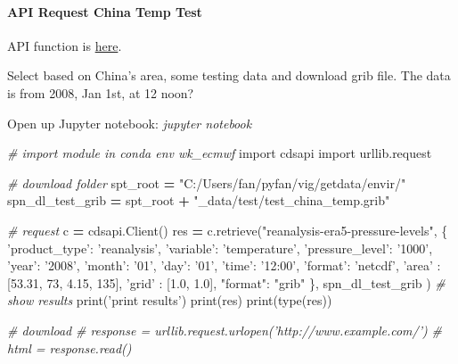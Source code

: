 \documentclass[
]{book}
\newenvironment{Shaded}{\begin{snugshade}}{\end{snugshade}}
\newcommand{\BuiltInTok}[1]{#1}
\newcommand{\CommentTok}[1]{\textcolor[rgb]{0.56,0.35,0.01}{\textit{#1}}}
\newcommand{\DecValTok}[1]{\textcolor[rgb]{0.00,0.00,0.81}{#1}}
\newcommand{\FloatTok}[1]{\textcolor[rgb]{0.00,0.00,0.81}{#1}}
\newcommand{\ImportTok}[1]{#1}
\newcommand{\NormalTok}[1]{#1}
\newcommand{\OperatorTok}[1]{\textcolor[rgb]{0.81,0.36,0.00}{\textbf{#1}}}
\newcommand{\StringTok}[1]{\textcolor[rgb]{0.31,0.60,0.02}{#1}}
\begin{document}
\hypertarget{api-request-china-temp-test}{%
\paragraph{API Request China Temp Test}\label{api-request-china-temp-test}}

API function is \href{https://github.com/ecmwf/cdsapi/blob/master/cdsapi/api.py}{here}.

Select based on China's area, some testing data and download grib file. The data is from 2008, Jan 1st, at 12 noon?

Open up Jupyter notebook: \emph{jupyter notebook}

\begin{Shaded}
\begin{Highlighting}[]
\CommentTok{# import module in conda env wk_ecmwf}
\ImportTok{import}\NormalTok{ cdsapi}
\ImportTok{import}\NormalTok{ urllib.request}

\CommentTok{# download folder}
\NormalTok{spt_root }\OperatorTok{=} \StringTok{"C:/Users/fan/pyfan/vig/getdata/envir/"}
\NormalTok{spn_dl_test_grib }\OperatorTok{=}\NormalTok{ spt_root }\OperatorTok{+} \StringTok{"_data/test/test_china_temp.grib"}

\CommentTok{# request}
\NormalTok{c }\OperatorTok{=}\NormalTok{ cdsapi.Client()}
\NormalTok{res }\OperatorTok{=}\NormalTok{ c.retrieve(}\StringTok{"reanalysis-era5-pressure-levels"}\NormalTok{,}
\NormalTok{  \{}
    \StringTok{'product_type'}\NormalTok{: }\StringTok{'reanalysis'}\NormalTok{,}
    \StringTok{'variable'}\NormalTok{: }\StringTok{'temperature'}\NormalTok{,}
    \StringTok{'pressure_level'}\NormalTok{: }\StringTok{'1000'}\NormalTok{,}
    \StringTok{'year'}\NormalTok{: }\StringTok{'2008'}\NormalTok{,}
    \StringTok{'month'}\NormalTok{: }\StringTok{'01'}\NormalTok{,}
    \StringTok{'day'}\NormalTok{: }\StringTok{'01'}\NormalTok{,}
    \StringTok{'time'}\NormalTok{: }\StringTok{'12:00'}\NormalTok{,}
    \StringTok{'format'}\NormalTok{: }\StringTok{'netcdf'}\NormalTok{,}
    \StringTok{'area'}\NormalTok{          : [}\FloatTok{53.31}\NormalTok{, }\DecValTok{73}\NormalTok{, }\FloatTok{4.15}\NormalTok{, }\DecValTok{135}\NormalTok{],}
    \StringTok{'grid'}\NormalTok{          : [}\FloatTok{1.0}\NormalTok{, }\FloatTok{1.0}\NormalTok{],}
    \StringTok{"format"}\NormalTok{: }\StringTok{"grib"}
\NormalTok{  \},}
\NormalTok{  spn_dl_test_grib}
\NormalTok{)}
\CommentTok{# show results}
\BuiltInTok{print}\NormalTok{(}\StringTok{'print results'}\NormalTok{)}
\BuiltInTok{print}\NormalTok{(res)}
\BuiltInTok{print}\NormalTok{(}\BuiltInTok{type}\NormalTok{(res))}

\CommentTok{# download}
\CommentTok{# response = urllib.request.urlopen('http://www.example.com/')}
\CommentTok{# html = response.read()}
\end{Highlighting}
\end{Shaded}
\end{document}
